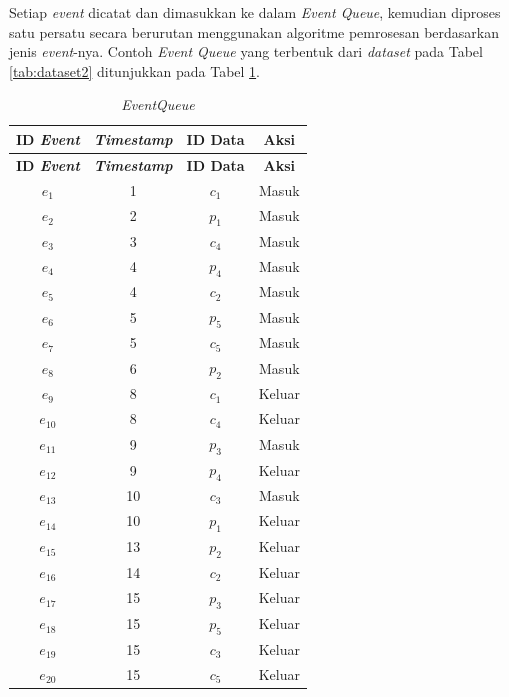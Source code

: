 Setiap \textit{event} dicatat dan dimasukkan ke dalam \textit{Event Queue}, kemudian diproses satu persatu secara berurutan menggunakan algoritme pemrosesan berdasarkan jenis \textit{event}-nya. Contoh \textit{Event Queue} yang terbentuk dari \textit{dataset} pada Tabel \ref{tab:dataset2} ditunjukkan pada Tabel \ref{tab:event-queue}.

\begin{small}
	\begin{longtable}{|c|c|c|c|}
		\caption{\textit{EventQueue} \label{tab:event-queue}}\\
		\hline
		\multicolumn{1}{|c|}{\textbf{ID \textit{Event}}} & \multicolumn{1}{c|}{\textbf{\textit{Timestamp}}} & \multicolumn{1}{c}{\textbf{ID Data}} & \multicolumn{1}{|c|}{\textbf{Aksi}} \\ \hline 
		\endfirsthead
		\hline
		\multicolumn{1}{|c|}{\textbf{ID \textit{Event}}} & \multicolumn{1}{c|}{\textbf{\textit{Timestamp}}} & \multicolumn{1}{c}{\textbf{ID Data}} & \multicolumn{1}{|c|}{\textbf{Aksi}} \\ \hline
		\endhead
		$e_1$ & 1 & $c_1$ & Masuk \\ \hline
		$e_2$ & 2 & $p_1$ & Masuk \\ \hline
		$e_3$ & 3 & $c_4$ & Masuk \\ \hline
		$e_4$ & 4 & $p_4$ & Masuk \\ \hline
		$e_5$ & 4 & $c_2$ & Masuk \\ \hline
		$e_6$ & 5 & $p_5$ & Masuk \\ \hline
		$e_7$ & 5 & $c_5$ & Masuk \\ \hline
		$e_8$ & 6 & $p_2$ & Masuk \\ \hline
		$e_9$ & 8 & $c_1$ & Keluar \\ \hline
		$e_{10}$ & 8 & $c_4$ & Keluar \\ \hline
		$e_{11}$ & 9 & $p_3$ & Masuk \\ \hline
		$e_{12}$ & 9 & $p_4$ & Keluar \\ \hline
		$e_{13}$ & 10 & $c_3$ & Masuk \\ \hline
		$e_{14}$ & 10 & $p_1$ & Keluar \\ \hline
		$e_{15}$ & 13 & $p_2$ & Keluar \\ \hline
		$e_{16}$ & 14 & $c_2$ & Keluar \\ \hline
		$e_{17}$ & 15 & $p_3$ & Keluar \\ \hline
		$e_{18}$ & 15 & $p_5$ & Keluar \\ \hline
		$e_{19}$ & 15 & $c_3$ & Keluar \\ \hline
		$e_{20}$ & 15 & $c_5$ & Keluar \\ \hline
	\end{longtable}
\end{small}

